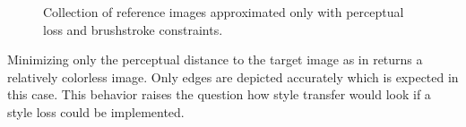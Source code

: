 \begin{figure}[!htb]
    \caption{Collection of reference images approximated only with perceptual loss and brushstroke constraints.}
\end{figure}
Minimizing only the perceptual distance to the target image as in  returns a relatively colorless image.
Only edges are depicted accurately which is expected in this case.
This behavior raises the question how style transfer would look if a style loss could be implemented.


